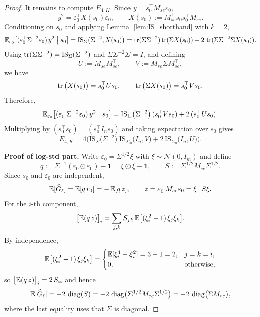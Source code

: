\begin{proof}
It remains to compute $E_{4,K}$. Since $y=s_0^\top M_{se}\varepsilon_0$,
\[
y^2=\varepsilon_0^\top X(s_0)\varepsilon_0,
\qquad
X(s_0):=M_{se}^\top s_0 s_0^\top M_{se}.
\]
Conditioning on $s_0$ and applying Lemma~\ref{lem:IS_shorthand} with $k=2$,
\[
{\mathbb{E}}_{\varepsilon_0}\!\left[
(\varepsilon_0^\top \Sigma^{-2}\varepsilon_0)\,y^2
\;\middle|\;s_0\right]
=
\mathrm{IS}_{\Sigma}\big(\Sigma^{-2},X(s_0)\big)
=
\operatorname{tr}(\Sigma\Sigma^{-2})\operatorname{tr}(\Sigma X(s_0))
+2\,\operatorname{tr}(\Sigma\Sigma^{-2}\Sigma X(s_0)).
\]
Using $\operatorname{tr}(\Sigma\Sigma^{-2})=\mathrm{IS}_{\Sigma}(\Sigma^{-2})$ and $\Sigma\Sigma^{-2}\Sigma=I$, and defining
\[
U := M_{se}M_{se}^\top,\qquad
V := M_{se}\Sigma M_{se}^\top,
\]
we have
\[
\operatorname{tr}\big(X(s_0)\big) = s_0^\top U s_0,
\qquad
\operatorname{tr}\big(\Sigma X(s_0)\big) = s_0^\top V s_0.
\]
Therefore,
\[
{\mathbb{E}}_{\varepsilon_0}\!\left[
(\varepsilon_0^\top \Sigma^{-2}\varepsilon_0)\,y^2
\;\middle|\;s_0\right]
=
\mathrm{IS}_{\Sigma}\big(\Sigma^{-2}\big)\,(s_0^\top V s_0)
+2\,(s_0^\top U s_0).
\]
Multiplying by $(s_0^\top s_0)=(s_0^\top I_n s_0)$ and taking expectation over $s_0$ gives
\[
E_{4,K}
=
4\Big(
\mathrm{IS}_{\Sigma}\big(\Sigma^{-2}\big)\;
\mathrm{IS}_{\Sigma_0}\big(I_n,V\big)
+
2\,\mathrm{IS}_{\Sigma_0}\big(I_n,U\big)
\Big).
\]

\medskip
\textbf{Proof of log-std part.}
Write $\varepsilon_0=\Sigma^{1/2}\xi$ with
$\xi\sim\mathcal N(0,I_m)$ and define
\[
q := \Sigma^{-1}(\varepsilon_0\odot \varepsilon_0) - \mathbf 1
= \xi\odot\xi-\mathbf 1,
\qquad
S:=\Sigma^{1/2}M_{ee}\Sigma^{1/2}.
\]
Since $s_0$ and $\varepsilon_0$ are independent,
\[
{\mathbb{E}}[\widehat G_\ell]
= {\mathbb{E}}[q\,r_0]
= -\,{\mathbb{E}}[q\,z],
\qquad
z=\varepsilon_0^\top M_{ee}\varepsilon_0=\xi^\top S\xi.
\]
For the $i$-th component,
\[
\big[{\mathbb{E}}(q\,z)\big]_i
= \sum_{j,k} S_{jk}\,{\mathbb{E}}\big[(\xi_i^2-1)\,\xi_j\xi_k\big].
\]
By independence,
\[
{\mathbb{E}}\big[(\xi_i^2-1)\,\xi_j\xi_k\big]
=\begin{cases}
{\mathbb{E}}[\xi_i^4-\xi_i^2]=3-1=2, & j=k=i,\\
0, & \text{otherwise},
\end{cases}
\]
so $\big[{\mathbb{E}}(q\,z)\big]_i = 2\,S_{ii}$ and hence
\[
{\mathbb{E}}[\widehat G_\ell]
= -2\,\operatorname{diag}(S)
= -2\,\operatorname{diag}\!\big(\Sigma^{1/2}M_{ee}\Sigma^{1/2}\big)
= -2\,\operatorname{diag}\!\big(\Sigma M_{ee}\big),
\]
where the last equality uses that $\Sigma$ is diagonal. 


\end{proof}
